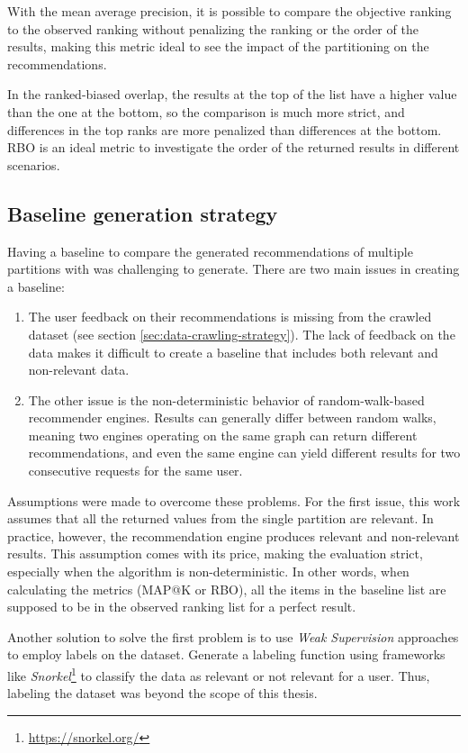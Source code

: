 With the mean average precision, it is possible to compare the objective ranking to the observed ranking without penalizing the ranking or the order of the results, making this metric ideal to see the impact of the partitioning on the recommendations.


In the ranked-biased overlap, the results at the top of the list have a higher value than the one at the bottom, so the comparison is much more strict, and differences in the top ranks are more penalized than differences at the bottom. RBO is an ideal metric to investigate the order of the returned results in different scenarios.


\subsection{Baseline generation strategy}
\label{subsec:baseline-generation}
Having a baseline to compare the generated recommendations of multiple partitions with was challenging to generate. There are two main issues in creating a baseline:
\begin{enumerate}
    \item The user feedback on their recommendations is missing from the crawled dataset (see section \ref{sec:data-crawling-strategy}). The lack of feedback on the data makes it difficult to create a baseline that includes both relevant and non-relevant data.
    
    \item The other issue is the non-deterministic behavior of random-walk-based recommender engines. Results can generally differ between random walks, meaning two engines operating on the same graph can return different recommendations, and even the same engine can yield different results for two consecutive requests for the same user.
\end{enumerate}

Assumptions were made to overcome these problems. For the first issue, this work assumes that all the returned values from the single partition are relevant. In practice, however, the recommendation engine produces relevant and non-relevant results. This assumption comes with its price, making the evaluation strict, especially when the algorithm is non-deterministic. In other words, when calculating the metrics (MAP@K or RBO), all the items in the baseline list are supposed to be in the observed ranking list for a perfect result.


Another solution to solve the first problem is to use \emph{Weak Supervision} approaches to employ labels on the dataset. Generate a labeling function using frameworks like \emph{Snorkel}\footnote{\url{https://snorkel.org/}} to classify the data as relevant or not relevant for a user. Thus, labeling the dataset was beyond the scope of this thesis.


